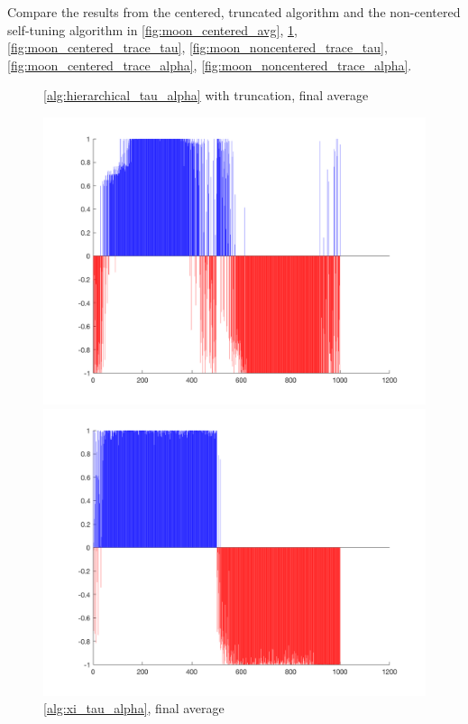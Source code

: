 \documentclass{siamart1116}
\begin{document}
Compare the results from the centered, truncated algorithm and the non-centered self-tuning algorithm in \cref{fig:moon_centered_avg}, \cref{fig:moon_noncentered_avg}, \cref{fig:moon_centered_trace_tau}, \cref{fig:moon_noncentered_trace_tau}, \cref{fig:moon_centered_trace_alpha}, \cref{fig:moon_noncentered_trace_alpha}.
\begin{figure}[H]
    \begin{minipage}{0.48\textwidth}
        \centering
        \caption{\label{fig:moon_centered_avg} \cref{alg:hierarchical_tau_alpha} with truncation, final average}
        \includegraphics[width=\linewidth]{graphics/moons/centered_truncated/final_avg.png}
    \end{minipage} \hfill
    \begin{minipage}{0.48\textwidth}
        \centering
        \caption{\label{fig:moon_noncentered_avg} \cref{alg:xi_tau_alpha}, final average}
        \includegraphics[width=\linewidth]{graphics/moons/noncentered_selftuning/final_avg.png}
    \end{minipage}
\end{figure}
\end{document}
